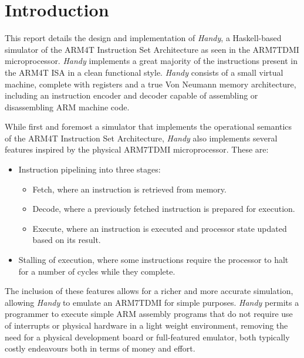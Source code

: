
\chapter{Introduction} %

\label{ch:introduction} %


This report details the design and implementation of \emph{Handy}, a Haskell-based simulator of the ARM4T Instruction Set Architecture as seen in the ARM7TDMI microprocessor. \emph{Handy} implements a great majority of the instructions present in the ARM4T ISA in a clean functional style. \emph{Handy} consists of a small virtual machine, complete with registers and a true Von Neumann memory architecture, including an instruction encoder and decoder capable of assembling or disassembling ARM machine code.

While first and foremost a simulator that implements the operational semantics of the ARM4T Instruction Set Architecture, \emph{Handy} also implements several features inspired by the physical ARM7TDMI microprocessor. These are:

\begin{itemize}
    \item Instruction pipelining into three stages:
      \begin{itemize}
        \item Fetch, where an instruction is retrieved from memory.
        \item Decode, where a previously fetched instruction is prepared for execution.
        \item Execute, where an instruction is executed and processor state updated based on its result.
      \end{itemize}
    \item Stalling of execution, where some instructions require the processor to halt for a number of cycles while they complete.
\end{itemize}

The inclusion of these features allows for a richer and more accurate simulation, allowing \emph{Handy} to emulate an ARM7TDMI for simple purposes. \emph{Handy} permits a programmer to execute simple ARM assembly programs that do not require use of interrupts or physical hardware in a light weight environment, removing the need for a physical development board or full-featured emulator, both typically costly endeavours both in terms of money and effort.

